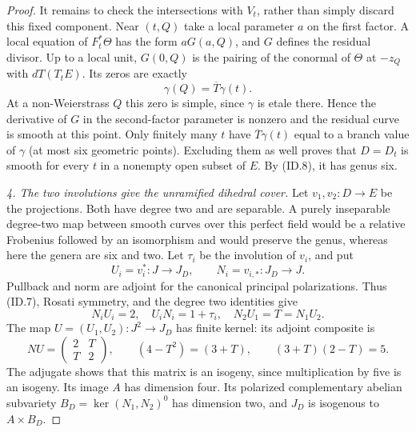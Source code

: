 \begin{proof}
It remains to check the intersections with $V_t$, rather
than simply discard this fixed component. Near $(t,Q)$
take a local parameter $a$ on the first factor. A local
equation of $F_t^*\Theta$ has the form $aG(a,Q)$, and $G$
defines the residual divisor. Up to a local unit,
$G(0,Q)$ is the pairing of the conormal of $\Theta$ at
$-z_Q$ with $dT(T_tE)$. Its zeros are exactly
\[
                         \gamma(Q)=\overline T\gamma(t).
 \tag{ID.15}
\]
At a non-Weierstrass $Q$ this zero is simple, since
$\gamma$ is etale there. Hence the derivative of $G$ in
the second-factor parameter is nonzero and the residual
curve is smooth at this point. Only finitely many $t$
have $\overline T\gamma(t)$ equal to a branch value of
$\gamma$ (at most six geometric points). Excluding them
as well proves that $D=D_t$ is smooth for every $t$ in a
nonempty open subset of $E$. By (ID.8), it has genus six.

\emph{4. The two involutions give the unramified dihedral cover.}
Let $v_1,v_2:D\to E$ be the projections. Both have degree
two and are separable. A purely inseparable degree-two map
between smooth curves over this perfect field would be a
relative Frobenius followed by an isomorphism and would
preserve the genus, whereas here the genera are six and two.
Let $\tau_i$ be the involution of $v_i$, and put
\[
 U_i=v_i^*:J\longrightarrow J_D,
       \qquad N_i=v_{i,*}:J_D\longrightarrow J.
 \tag{ID.16}
\]
Pullback and norm are adjoint for the canonical principal
polarizations. Thus (ID.7), Rosati symmetry, and the degree
two identities give
\[
 N_iU_i=2,\quad U_iN_i=1+\tau_i,\quad
 N_2U_1=T=N_1U_2.
 \tag{ID.17}
\]
The map $U=(U_1,U_2):J^2\to J_D$ has finite kernel:
its adjoint composite is
\[
 NU=\begin{pmatrix}2&T\\T&2\end{pmatrix},
 \qquad
 (4-T^2)=(3+T),\qquad (3+T)(2-T)=5.
 \tag{ID.18}
\]
The adjugate shows that this matrix is an isogeny, since
multiplication by five is an isogeny. Its image $A$ has
dimension four. Its polarized complementary abelian
subvariety $B_D=\ker(N_1,N_2)^0$ has dimension two, and
$J_D$ is isogenous to $A\times B_D$.


\end{proof}
